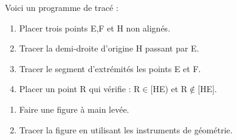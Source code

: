 \documentclass[exercice]{thedocument}%
\begin{document}
%
\begin{minipage}[t]{.4\linewidth}
    Voici un programme de tracé :
    \begin{mdframed}
        \begin{enumerate}[label=\alph*-,font=\bfseries]
            \item Placer trois points E,F et H non alignés.
            \item Tracer la demi-droite d'origine H passant par E.
            \item Tracer le segment d'extrémités les points E et F.
            \item Placer un point R qui vérifie : R$\in$[HE) et R$\notin$[HE].
        \end{enumerate}
    \end{mdframed}
    \end{minipage}\hspace{.05\linewidth}
    \begin{minipage}[t]{.45\linewidth}
        \begin{enumerate}
            \item Faire une figure à main levée.\vskip80pt
            \item Tracer la figure en utilisant les instruments de géométrie.
        \end{enumerate}
    \end{minipage}
\end{document}
